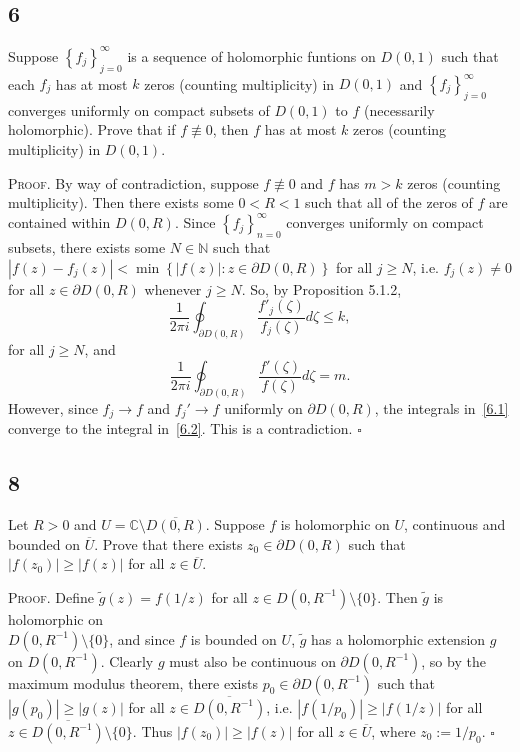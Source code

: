 \documentclass[12pt]{article}
\newcounter{ProofCounter}
\newenvironment{Proof}{\stepcounter{ProofCounter}\textsc{Proof.}}{\hfill$\square$}
\begin{document}
\subsection*{6}
\begin{tcolorbox}
  Suppose $\left\{ f_j \right\}_{j=0}^{\infty}$ is a sequence of holomorphic funtions on $D(0,1)$ such that each $f_j$ has at most $k$ zeros (counting
  multiplicity) in $D(0,1)$ and $\left\{ f_j \right\}_{j=0}^{\infty}$ converges uniformly on compact subsets of $D(0,1)$ to $f$ (necessarily
  holomorphic). Prove that if $f
  \not\equiv 0$, then $f$ has at most $k$ zeros (counting multiplicity) in $D(0,1)$.
\end{tcolorbox}
\begin{Proof}
  By way of contradiction, suppose $f \not\equiv 0$ and $f$ has $m > k$ zeros (counting multiplicity). Then there exists some $0 < R < 1$ such that
  all of the zeros of $f$ are contained within $D(0,R)$. Since $\left\{ f_j \right\}_{n=0}^{\infty}$ converges uniformly on compact subsets, there
  exists some $N \in \mathbb{N}$ such that $|f(z) - f_j(z)| < \min\left\{ |f(z)| : z \in \partial D(0,R) \right\}$ for all $j \geq N$, i.e. $f_j(z) \neq
  0$ for all $z \in \partial D(0,R)$ whenever $j \geq N$. So, by Proposition 5.1.2,
  \begin{equation}
    \frac{1}{2\pi i}\oint_{\partial D(0,R)}\frac{f'_j(\zeta)}{f_j(\zeta)}d\zeta \leq k,
    \label{6.1}
  \end{equation}
  for all $j \geq N$, and 
  \begin{equation}
    \frac{1}{2\pi i}\oint_{\partial D(0,R)}\frac{f'(\zeta)}{f(\zeta)}d\zeta = m.
    \label{6.2}
  \end{equation}
  However, since $f_j \rightarrow f$ and $f_j' \rightarrow f$ uniformly on $\partial D(0,R)$, the integrals in~\eqref{6.1} converge to the integral 
  in~\eqref{6.2}. This is a contradiction.
\end{Proof}


\newpage
\subsection*{8}
\begin{tcolorbox}
  Let $R > 0$ and $U = \mathbb{C} \setminus \overline{D(0,R)}$. Suppose $f$ is holomorphic on $U$, continuous and bounded on $\overline{U}$. Prove
  that there exists $z_0 \in \partial D(0,R)$ such that $|f(z_0)| \geq |f(z)|$ for all $z \in \overline{U}$.
\end{tcolorbox}
\begin{Proof}
  Define $\tilde{g}(z) = f(1/z)$ for all $z \in D(0,R^{-1})\setminus \{0\}$. Then $\tilde{g}$ is holomorphic on \\
  $D(0,R^{-1})\setminus\{0\}$, 
  and since $f$ is bounded on $U$, $\tilde{g}$ has a holomorphic extension $g$ on $D(0,R^{-1})$. Clearly $g$ must also be continuous on $\partial
  D(0,R^{-1})$, so by the maximum modulus theorem, there exists $p_0 \in \partial D(0,R^{-1})$ such that $|g(p_0)| \geq |g(z)|$ for all $z \in
  \overline{D(0,R^{-1})}$, i.e. $|f(1/p_0)| \geq |f(1/z)|$ for all $z \in \overline{D(0,R^{-1})}\setminus\{0\}$. Thus $|f(z_0)| \geq |f(z)|$ for all
  $z \in \overline{U}$, where $z_0 := 1/p_0$.
\end{Proof}
\end{document}
